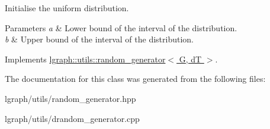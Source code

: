 Initialise the uniform distribution. 


\begin{DoxyParams}{Parameters}
{\em a} & Lower bound of the interval of the distribution. \\
\hline
{\em b} & Upper bound of the interval of the distribution. \\
\hline
\end{DoxyParams}


Implements \hyperlink{classlgraph_1_1utils_1_1random__generator_a129da597bed5b08e9c7e5a3ddce4287c}{lgraph\-::utils\-::random\-\_\-generator$<$ G, d\-T $>$}.



The documentation for this class was generated from the following files\-:\begin{DoxyCompactItemize}
\item 
lgraph/utils/random\-\_\-generator.\-hpp\item 
lgraph/utils/drandom\-\_\-generator.\-cpp\end{DoxyCompactItemize}
